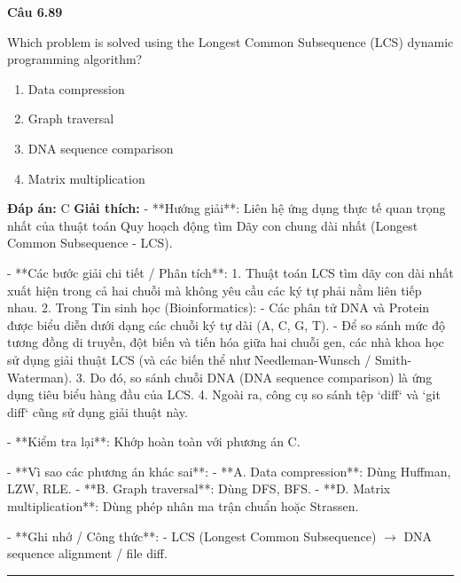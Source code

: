 \documentclass[11pt,a4paper]{article}
\newenvironment{question}[1]{%
  \par\vspace{1em}\noindent\textbf{\large Câu #1}\par\vspace{0.4em}
}{%
  \par\vspace{1em}\hrule\vspace{0.6em}
}
\newenvironment{choices}{%
  \begin{enumerate}[label=\textbf{\Alph*.},leftmargin=2.2em,itemsep=2pt,topsep=3pt]
}{%
  \end{enumerate}
}
\newcommand{\choice}{\item}
\begin{document}
\begin{question}{6.89}
Which problem is solved using the Longest Common Subsequence (LCS) dynamic programming algorithm?
\begin{choices}
\choice Data compression
\choice Graph traversal
\choice DNA sequence comparison
\choice Matrix multiplication
\end{choices}
\textbf{Đáp án:} C
\textbf{Giải thích:} - **Hướng giải**:
  Liên hệ ứng dụng thực tế quan trọng nhất của thuật toán Quy hoạch động tìm Dãy con chung dài nhất (Longest Common Subsequence - LCS).

- **Các bước giải chi tiết / Phân tích**:
  1. Thuật toán LCS tìm dãy con dài nhất xuất hiện trong cả hai chuỗi mà không yêu cầu các ký tự phải nằm liên tiếp nhau.
  2. Trong Tin sinh học (Bioinformatics):
     - Các phân tử DNA và Protein được biểu diễn dưới dạng các chuỗi ký tự dài (A, C, G, T).
     - Để so sánh mức độ tương đồng di truyền, đột biến và tiến hóa giữa hai chuỗi gen, các nhà khoa học sử dụng giải thuật LCS (và các biến thể như Needleman-Wunsch / Smith-Waterman).
  3. Do đó, so sánh chuỗi DNA (DNA sequence comparison) là ứng dụng tiêu biểu hàng đầu của LCS.
  4. Ngoài ra, công cụ so sánh tệp `diff` và `git diff` cũng sử dụng giải thuật này.

- **Kiểm tra lại**:
  Khớp hoàn toàn với phương án C.

- **Vì sao các phương án khác sai**:
  - **A. Data compression**: Dùng Huffman, LZW, RLE.
  - **B. Graph traversal**: Dùng DFS, BFS.
  - **D. Matrix multiplication**: Dùng phép nhân ma trận chuẩn hoặc Strassen.

- **Ghi nhớ / Công thức**:
  - LCS (Longest Common Subsequence) \(\rightarrow\) DNA sequence alignment / file diff.
\end{question}
\end{document}
